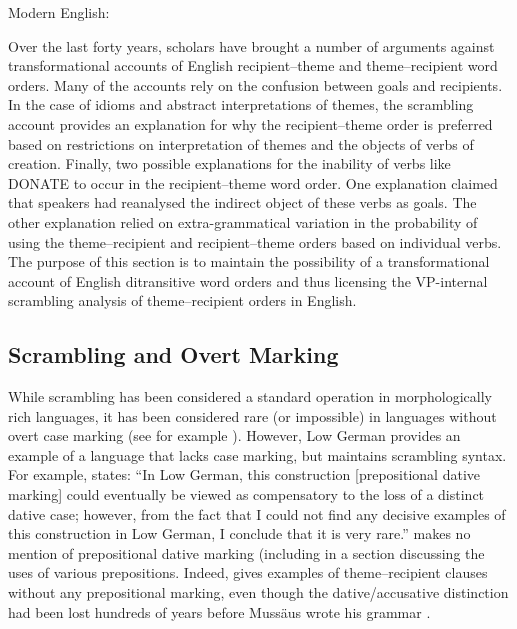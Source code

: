 \begin{exe}
	\ex Modern English:\label{ex:en-donate}
	\begin{xlist}
		\label{ex:kidney}
		\label{ex:donate-inanim}
	\end{xlist}
\end{exe}

Over the last forty years, scholars have brought a number of arguments against transformational accounts of English recipient--theme and theme--recipient word orders. Many of the accounts rely on the confusion between goals and recipients. In the case of idioms and abstract interpretations of themes, the scrambling account provides an explanation for why the recipient--theme order is preferred based on restrictions on interpretation of themes and the objects of verbs of creation. Finally, two possible explanations for the inability of verbs like DONATE to occur in the recipient--theme word order. One explanation claimed that speakers had reanalysed the indirect object of these verbs as goals. The other explanation relied on extra-grammatical variation in the probability of using the theme--recipient and recipient--theme orders based on individual verbs. The purpose of this section is to maintain the possibility of a transformational account of English ditransitive word orders and thus licensing the VP-internal scrambling analysis of theme--recipient orders in English.

\subsection{Scrambling and Overt Marking}

While scrambling has been considered a standard operation in morphologically rich languages, it has been considered rare (or impossible) in languages without overt case marking (see for example \citet{Weerman.1997}). However, Low German provides an example of a language that lacks case marking, but maintains scrambling syntax. For example, \cite{Fleischer.2006} states: ``In Low German, this construction [prepositional dative marking] could eventually be viewed as compensatory to the loss of a distinct dative case; however, from the fact that I could not find any decisive examples of this construction in Low German, I conclude that it is very rare.'' \cite{Lindow.1998} makes no mention of prepositional dative marking (including in a section discussing the uses of various prepositions. Indeed, \cite{Mussaus.1829} gives examples of theme--recipient clauses without any prepositional marking, even though the dative/accusative distinction had been lost hundreds of years before Mussäus wrote his grammar \citep{Lasch.1914,Boden.1993}.

